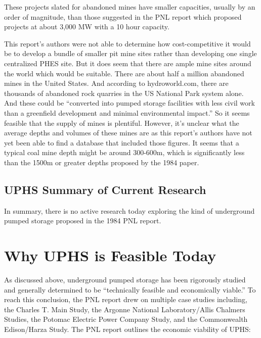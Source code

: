 \documentclass[hidelinks,12pt,a4paper]{article}
\begin{document}
These projects slated for abandoned mines have smaller capacities, usually by an order of magnitude, than those suggested in the PNL report which proposed projects at about 3,000 MW with a 10 hour capacity. \cite{UndergroundPumpedHydroelectricStorage}

This report's authors were not able to determine how cost-competitive it would be to develop a bundle of smaller pit mine sites rather than developing one single centralized PHES site. But it does seem that there are ample mine sites around the world which would be suitable. There are about half a million abandoned mines in the United States. \cite{MappingInactiveMetalMinesAcrossTheUS} And according to hydroworld.com, there are thousands of abandoned rock quarries in the US National Park system alone. And these could be “converted into pumped storage facilities with less civil work than a greenfield development and minimal environmental impact.” \cite{PumpedStorageElmhurstQuarryProject} So it seems feasible that the supply of mines is plentiful. However, it's unclear what the average depths and volumes of these mines are as this report's authors have not yet been able to find a database that included those figures. It seems that a typical coal mine depth might be around 300-600m, \cite{UndergroundPumpedStorageHydroInAbandonedCoalMines} which is significantly less than the 1500m or greater depths proposed by the 1984 paper.


\subsection{UPHS Summary of Current Research}
In summary, there is no active research today exploring the kind of underground pumped storage proposed in the 1984 PNL report.

\pagebreak[1]
\section{Why UPHS is Feasible Today}
As discussed above, underground pumped storage has been rigorously studied and generally determined to be “technically feasible and economically viable.” \cite{UndergroundPumpedHydroelectricStorage} To reach this conclusion, the PNL report drew on multiple case studies including, the Charles T. Main Study, the Argonne National Laboratory/Allis Chalmers Studies, the Potomac Electric Power Company Study, and the Commonwealth Edison/Harza Study. The PNL report outlines the economic viability of UPHS:
\end{document}
